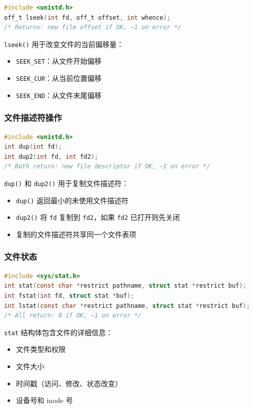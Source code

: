 
\begin{lstlisting}[language=C]
#include <unistd.h>
off_t lseek(int fd, off_t offset, int whence);
/* Returns: new file offset if OK, −1 on error */
\end{lstlisting}

\texttt{lseek()} 用于改变文件的当前偏移量：
\begin{itemize}
  \item \texttt{SEEK\_SET}：从文件开始偏移
  \item \texttt{SEEK\_CUR}：从当前位置偏移
  \item \texttt{SEEK\_END}：从文件末尾偏移
\end{itemize}

\subsubsection{文件描述符操作}


\begin{lstlisting}[language=C]
#include <unistd.h>
int dup(int fd);
int dup2(int fd, int fd2);
/* Both return: new file descriptor if OK, −1 on error */
\end{lstlisting}

\texttt{dup()} 和 \texttt{dup2()} 用于复制文件描述符：
\begin{itemize}
  \item \texttt{dup()} 返回最小的未使用文件描述符
  \item \texttt{dup2()} 将 \texttt{fd} 复制到 \texttt{fd2}，如果 \texttt{fd2} 已打开则先关闭
  \item 复制的文件描述符共享同一个文件表项
\end{itemize}

\subsubsection{文件状态}


\begin{lstlisting}[language=C]
#include <sys/stat.h>
int stat(const char *restrict pathname, struct stat *restrict buf);
int fstat(int fd, struct stat *buf);
int lstat(const char *restrict pathname, struct stat *restrict buf);
/* All return: 0 if OK, −1 on error */
\end{lstlisting}

\texttt{stat} 结构体包含文件的详细信息：
\begin{itemize}
  \item 文件类型和权限
  \item 文件大小
  \item 时间戳（访问、修改、状态改变）
  \item 设备号和 inode 号
\end{itemize}

